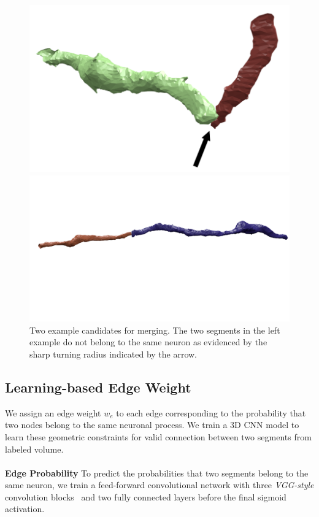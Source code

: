 \begin{figure}[t]
	\begin{minipage}{0.4\linewidth}
		\includegraphics[width=\linewidth]{./figures/constraint_error.png}
	\end{minipage}
	\hfill
	\begin{minipage}{0.55\linewidth}
		\includegraphics[width=\linewidth]{./figures/constraint_success.png}
	\end{minipage}
	\caption{Two example candidates for merging. The two segments in the left example do not belong to the same neuron as evidenced by the sharp turning radius indicated by the arrow.}
	\label{fig:turn-radii}
\end{figure}
\subsection{Learning-based Edge Weight}
\label{sec:edge-weights}
We assign an edge weight $w_e$ to each edge corresponding to the probability that two nodes belong to the same neuronal process.
We train a 3D CNN model to learn these geometric constraints for valid connection between two segments from labeled volume.
\\~\\
\noindent\textbf{Edge Probability}
To predict the probabilities that two segments belong to the same neuron, we train a feed-forward convolutional network with three \textit{VGG-style} convolution blocks~\cite{chatfield2014return} and two fully connected layers before the final sigmoid activation. 

